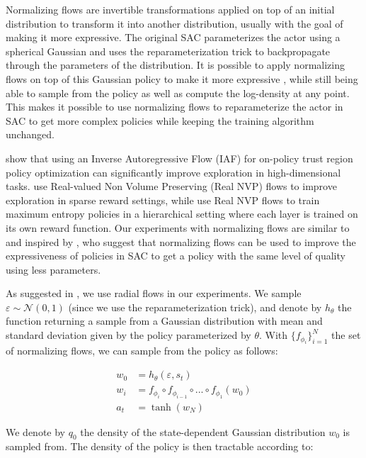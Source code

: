 \documentclass[letterpaper]{article} \usepackage{aaai20}  \usepackage{times}  \usepackage{helvet} \usepackage{courier}  \usepackage[hyphens]{url}  \usepackage{graphicx} \urlstyle{rm} \def\UrlFont{\rm}  \usepackage{graphicx}  \usepackage[section]{placeins}
\begin{document}
Normalizing flows \cite{normalizingflows2015} are invertible transformations applied on top of an initial distribution to transform it into another distribution, usually with the goal of making it more expressive. The original SAC \cite{haarnoja2018soft} parameterizes the actor using a spherical Gaussian and uses the reparameterization trick to backpropagate through the parameters of the distribution. It is possible to apply normalizing flows on top of this Gaussian policy to make it more expressive \cite{mazoure2019leveraging}, while still being able to sample from the policy as well as compute the log-density at any point. This makes it possible to use normalizing flows to reparameterize the actor in SAC to get more complex policies while keeping the training algorithm unchanged.  

\cite{normflowsboostingtrpo} show that using an Inverse Autoregressive Flow (IAF) for on-policy trust region policy optimization can significantly improve exploration in high-dimensional tasks. \cite{ward2019improvingflows} use Real-valued Non Volume Preserving (Real NVP) flows to improve exploration in sparse reward settings, while \cite{haarnojaHSAC} use Real NVP flows to train maximum entropy policies in a hierarchical setting where each layer is trained on its own reward function. Our experiments with normalizing flows are similar to and inspired by \cite{mazoure2019leveraging}, who suggest that normalizing flows can be used to improve the expressiveness of policies in SAC to get a policy with the same level of quality using less parameters.  

As suggested in \cite{mazoure2019leveraging}, we use radial flows in our experiments. We sample $\varepsilon \sim \mathcal{N}(0, 1)$ (since we use the reparameterization trick), and denote by $h_{\theta}$ the function returning a sample from a Gaussian distribution with mean and standard deviation given by the policy parameterized by $\theta$. With $\{f_{\phi_i}\}_{i=1}^N$ the set of normalizing flows, we can sample from the policy as follows:

\begin{align*}
    w_0 &= h_{\theta}(\varepsilon, s_t) \\
    w_i &= f_{\phi_i} \circ f_{\phi_{i-1}} \circ ... \circ f_{\phi_{1}}(w_0) \\
    a_t &= \tanh(w_N)
\end{align*}

We denote by $q_0$ the density of the state-dependent Gaussian distribution $w_0$ is sampled from. The density of the policy is then tractable according to: 
\end{document}
